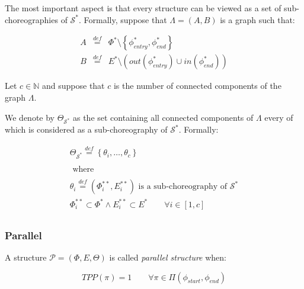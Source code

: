 \documentclass[10pt,a4paper]{report}
\newcommand*{\N}{\mathbb{N}}
\newcommand{\mathDef}{\overset{\textit{def}}{=}}
\theoremstyle{definition}
\begin{document}
The most important aspect is that every structure can be viewed as a set of sub-choreographies of $\mathcal{S}^*$. Formally, suppose that $\Lambda = (A,B)$ is a graph such that:

\begin{equation}
	\begin{array}{lll}
		A & \mathDef & \Phi^* \setminus \left\lbrace \phi_{entry}^*,\phi_{end}^* \right\rbrace   \\
		B & \mathDef & E^* \setminus \left( out\left(\phi_{entry}^*\right) \cup in\left(\phi_{end}^*\right) \right)
	\end{array}
\end{equation}

Let $c \in \N$ and suppose that $c$ is the number of connected components of the graph $\Lambda$.

We denote by $\Theta_{\mathcal{S}^*}$ as the set containing all connected components of $\Lambda$ every of which is considered as a sub-choreography of $\mathcal{S}^*$. Formally:

\begin{equation}
	\begin{array}{c}
		\Theta_{\mathcal{S}^*} \mathDef \left\lbrace \theta_i, \ldots ,\theta_c \right\rbrace \\\\
		\text{ where } \\\\
		
		\theta_i \mathDef (\Phi^{**}_i, E^{**}_i) \text{ is a sub-choreography of } \mathcal{S}^* \\
		\Phi^{**}_i \subset \Phi^{*} \wedge E^{**}_i \subset E^{*} \qquad \forall i \in \left[ 1, c \right] \\
	\end{array}
\end{equation} 

\subsubsection{Parallel}

A structure $\mathcal{P} = (\Phi,E,\Theta)$ is called \textit{parallel structure} when:

\begin{equation}
	TPP(\pi) = 1 \qquad \forall \pi \in \Pi(\phi_{start}, \phi_{end})
\end{equation}
\end{document}
